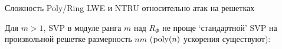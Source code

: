 \documentclass[usenames,dvipsnames, 9pt]{beamer}
\begin{document}
\begin{frame}{Сложность Poly/Ring LWE и NTRU относительно атак на решетках} 
	
	\LARGE
	Для $m>1$, SVP в модуле ранга $m$ над $R_\Phi$ не проще `стандартной' SVP на произвольной решетке размерность $nm$ ($\mathrm{poly}(n)$ ускорения существуют):
	
\end{frame}
\end{document}

